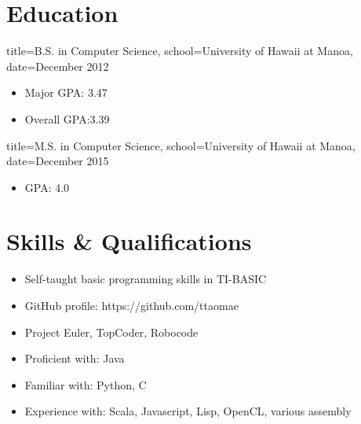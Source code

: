 \documentclass{resume}
\begin{document}

\makeheader

\section*{Education}
\begin{degree}{title=B.S. in Computer Science,
               school=University of Hawaii at Manoa,
               date=December 2012}
    \begin{itemize}
        \item{Major GPA: 3.47}
        \item{Overall GPA:3.39}
    \end{itemize}
\end{degree}

\begin{degree}{title=M.S. in Computer Science,
               school=University of Hawaii at Manoa,
               date=December 2015}
    \begin{itemize}
        \item{GPA: 4.0}
    \end{itemize}
\end{degree}

\section*{Skills \& Qualifications}
\begin{itemize}
    \item{Self-taught basic programming skills in TI-BASIC}
\end{itemize}

\begin{itemize}
    \item{GitHub profile: https://github.com/ttaomae}
    \item{Project Euler, TopCoder, Robocode}
\end{itemize}

\begin{itemize}
    \item{Proficient with: Java}
    \item{Familiar with: Python, C}
    \item{Experience with: Scala, Javascript, Lisp, OpenCL, various assembly}
\end{itemize}
\end{document}
